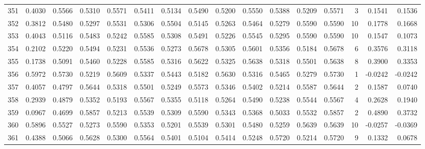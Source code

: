 \begin{tabular}{lrrrrrrrrrrrrrrr}
351 &      0.4030 &  0.5566 &  0.5310 &  0.5571 &  0.5411 &  0.5134 &  0.5490 &  0.5200 &  0.5550 &  0.5388 &   0.5209 &     0.5571 &      3 &                    0.1541 &                     0.1536 \\
352 &      0.3812 &  0.5480 &  0.5297 &  0.5531 &  0.5306 &  0.5504 &  0.5145 &  0.5263 &  0.5464 &  0.5279 &   0.5590 &     0.5590 &     10 &                    0.1778 &                     0.1668 \\
353 &      0.4043 &  0.5116 &  0.5483 &  0.5242 &  0.5585 &  0.5308 &  0.5491 &  0.5226 &  0.5545 &  0.5295 &   0.5590 &     0.5590 &     10 &                    0.1547 &                     0.1073 \\
354 &      0.2102 &  0.5220 &  0.5494 &  0.5231 &  0.5536 &  0.5273 &  0.5678 &  0.5305 &  0.5601 &  0.5356 &   0.5184 &     0.5678 &      6 &                    0.3576 &                     0.3118 \\
355 &      0.1738 &  0.5091 &  0.5460 &  0.5228 &  0.5585 &  0.5316 &  0.5622 &  0.5325 &  0.5638 &  0.5318 &   0.5501 &     0.5638 &      8 &                    0.3900 &                     0.3353 \\
356 &      0.5972 &  0.5730 &  0.5219 &  0.5609 &  0.5337 &  0.5443 &  0.5182 &  0.5630 &  0.5316 &  0.5465 &   0.5279 &     0.5730 &      1 &                   -0.0242 &                    -0.0242 \\
357 &      0.4057 &  0.4797 &  0.5644 &  0.5318 &  0.5501 &  0.5249 &  0.5573 &  0.5346 &  0.5402 &  0.5214 &   0.5587 &     0.5644 &      2 &                    0.1587 &                     0.0740 \\
358 &      0.2939 &  0.4879 &  0.5352 &  0.5193 &  0.5567 &  0.5355 &  0.5118 &  0.5264 &  0.5490 &  0.5238 &   0.5544 &     0.5567 &      4 &                    0.2628 &                     0.1940 \\
359 &      0.0967 &  0.4699 &  0.5857 &  0.5213 &  0.5539 &  0.5309 &  0.5590 &  0.5343 &  0.5368 &  0.5033 &   0.5532 &     0.5857 &      2 &                    0.4890 &                     0.3732 \\
360 &      0.5896 &  0.5527 &  0.5273 &  0.5590 &  0.5353 &  0.5201 &  0.5539 &  0.5301 &  0.5480 &  0.5259 &   0.5639 &     0.5639 &     10 &                   -0.0257 &                    -0.0369 \\
361 &      0.4388 &  0.5066 &  0.5628 &  0.5300 &  0.5564 &  0.5401 &  0.5104 &  0.5414 &  0.5248 &  0.5720 &   0.5214 &     0.5720 &      9 &                    0.1332 &                     0.0678 \\

\end{tabular}
